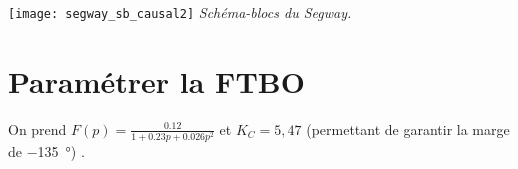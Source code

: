 \begin{multicols}{2}
\begin{center}%
\texttt{[image: segway\_sb\_causal2]}
\textit{Schéma-blocs du Segway\textregistered.} \label{ex_segway_SB}
\end{center}%



\section*{Paramétrer la FTBO}

On prend $F(p)=\frac{\num{0.12}}{1+\num{0.23} p + \num{0.026} p^2}$ et $K_C=5,47$ (permettant de garantir la marge de  \SI{-135}{\degree}) .





\end{multicols}
